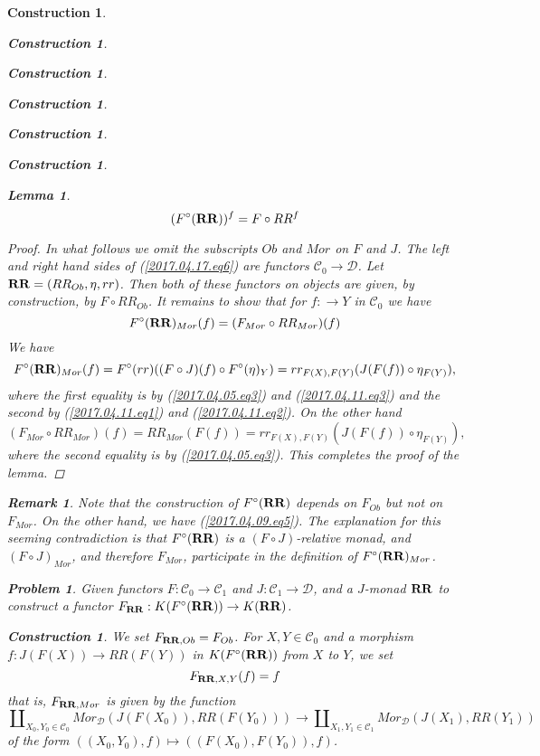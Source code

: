 \documentclass[12pt]{amsart}
\newenvironment{eq}{\begin{equation}}{\end{equation}}
\newtheorem{lemma}[proposition]{Lemma}
\newtheorem{remark}[proposition]{Remark}
\newtheorem{problem}[proposition]{Problem}
\newtheorem{construction}[proposition]{Construction}
\newcommand{\llabel}[1]{\label{#1}}
\newcommand{\sr}{\rightarrow}
\newcommand{\RR}{{\bf RR}}
\newcommand{\C}{{\mathcal C}}
\newcommand{\D}{{\mathcal D}}
\begin{document}
\begin{construction}
\begin{construction}
\begin{construction}
\begin{construction}
\begin{construction}
\begin{construction}
\begin{lemma}
\begin{eq}
\llabel{2017.04.17.eq6}
(F^{\circ}(\RR))^f=F\circ RR^f
\end{eq}%
%
\end{lemma}
%
\begin{proof}
In what follows we omit the subscripts $Ob$ and $Mor$ on $F$ and $J$. The
left and right hand sides of (\ref{2017.04.17.eq6}) are functors
$\C_0\sr\D$. Let $\RR=(RR_{Ob},\eta,rr)$. Then both of these functors on
objects are given, by construction, by $F\circ RR_{Ob}$. It remains to show
that for $f:\sr Y$ in $\C_0$ we have
%
\begin{eq}
\llabel{2017.04.09.eq5}
F^{\circ}(\RR)_{Mor}(f)=(F_{Mor}\circ RR_{Mor})(f)
\end{eq}%
%
We have
%
$$F^{\circ}(\RR)_{Mor}(f)=F^{\circ}(rr)((F\circ J)(f)\circ F^{\circ}(\eta)_Y)=rr_{F(X),F(Y)}(J(F(f))\circ \eta_{F(Y)}),$$
%
where the first equality is by (\ref{2017.04.05.eq3}) and
(\ref{2017.04.11.eq3}) and the second by (\ref{2017.04.11.eq1}) and
(\ref{2017.04.11.eq2}). On the other hand
%
$$(F_{Mor}\circ RR_{Mor})(f)=RR_{Mor}(F(f))=rr_{F(X),F(Y)}(J(F(f))\circ \eta_{F(Y)}),$$
%
where the second equality is by (\ref{2017.04.05.eq3}). This completes the proof of the lemma.
\end{proof}
%
\begin{remark}\rm\llabel{2017.04.09.rem1}
Note that the construction of $F^{\circ}(\RR)$ depends on
$F_{Ob}$ but not on $F_{Mor}$.  On the other hand, we have
(\ref{2017.04.09.eq5}). The explanation for this seeming contradiction is that
$F^{\circ}(\RR)$ is a $(F\circ J)$-relative monad, and $(F\circ J)_{Mor}$, and
therefore $F_{Mor}$, participate in the definition of $F^{\circ}(\RR)_{Mor}$.
\end{remark}
%
\begin{problem}
\llabel{2017.03.12.prob1} Given functors $F:\C_0\sr \C_1$ and $J:\C_1\sr \D$,
and a $J$-monad $\RR$ to construct a functor $F_{\RR}:K(F^{\circ}(\RR))\sr
K(\RR)$.
\end{problem}
%
\begin{construction}\rm
\llabel{2017.03.12.constr2} We set $F_{\RR,Ob}=F_{Ob}$. For $X,Y\in\C_0$ and a
morphism $f:J(F(X))\sr RR(F(Y))$ in $K(F^{\circ}(\RR))$ from $X$ to $Y$, we set
%
\begin{eq}
\llabel{2017.03.12.eq2}
F_{\RR,X,Y}(f)=f
\end{eq}%
%
that is, $F_{\RR,Mor}$ is given by the function
%
$$\amalg_{X_0,Y_0\in\C_0}Mor_{\D}(J(F(X_0)),RR(F(Y_0)))\sr \amalg_{X_1,Y_1\in\C_1}Mor_{\D}(J(X_1),RR(Y_1))$$
%
of the form $((X_0,Y_0),f)\mapsto ((F(X_0),F(Y_0)),f)$. 


\end{construction}
\end{construction}
\end{construction}
\end{construction}
\end{construction}
\end{construction}
\end{construction}
\end{document}
